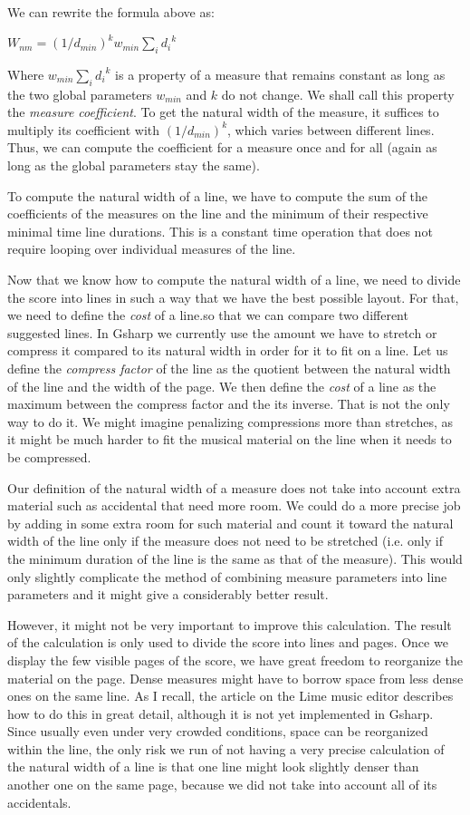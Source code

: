 \documentclass[11pt]{book}
\def\gs{Gsharp}
\begin{document}
We can rewrite the formula above as:

$W_{nm} = {(1 / d_{min})}^k w_{min}  \sum_i {d_i}^k$

Where $w_{min}  \sum_i {d_i}^k$ is a property of a measure that
remains constant as long as the two global parameters $w_{min}$ and
$k$ do not change.  We shall call this property the \emph{measure
coefficient}.  To get the natural width of the measure, it suffices to
multiply its coefficient with ${(1 / d_{min})}^k$, which varies
between different lines.  Thus, we can compute the coefficient for a
measure once and for all (again as long as the global parameters stay
the same). 

To compute the natural width of a line, we have to compute the sum of
the coefficients of the measures on the line and the minimum of their
respective minimal time line durations.  This is a constant time
operation that does not require looping over individual measures of
the line.  

Now that we know how to compute the natural width of a line, we need
to divide the score into lines in such a way that we have the best
possible layout.  For that, we need to define the \emph{cost} of a
line.so that we can compare two different suggested lines.  In {\gs}
we currently use the amount we have to stretch or compress it compared
to its natural width in order for it to fit on a line.  Let us define
the \emph{compress factor} of the line as the quotient between the
natural width of the line and the width of the page.  We then define
the \emph{cost} of a line as the maximum between the compress factor
and the its inverse.  That is not the only way to do it.  We might
imagine penalizing compressions more than stretches, as it might be
much harder to fit the musical material on the line when it needs to
be compressed. 

Our definition of the natural width of a measure does not take into
account extra material such as accidental that need more room.  We
could do a more precise job by adding in some extra room for such
material and count it toward the natural width of the line only if the
measure does not need to be stretched (i.e. only if the minimum
duration of the line is the same as that of the measure).  This would
only slightly complicate the method of combining measure parameters
into line parameters and it might give a considerably better result. 

However, it might not be very important to improve this calculation.
The result of the calculation is only used to divide the score into
lines and pages.  Once we display the few visible pages of the score,
we have great freedom to reorganize the material on the page.  Dense
measures might have to borrow space from less dense ones on the same
line.  As I recall, the article on the Lime music editor describes how
to do this in great detail, although it is not yet implemented in
{\gs}.  Since usually even under very crowded conditions, space can be
reorganized within the line, the only risk we run of not having a very
precise calculation of the natural width of a line is that one line
might look slightly denser than another one on the same page, because
we did not take into account all of its accidentals. 
\end{document}
